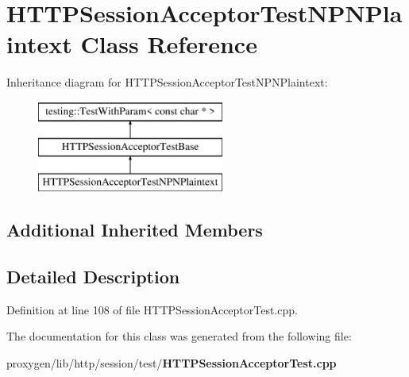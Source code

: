 \section{H\+T\+T\+P\+Session\+Acceptor\+Test\+N\+P\+N\+Plaintext Class Reference}
\label{classHTTPSessionAcceptorTestNPNPlaintext}
Inheritance diagram for H\+T\+T\+P\+Session\+Acceptor\+Test\+N\+P\+N\+Plaintext\+:\begin{figure}[H]
\begin{center}
\leavevmode
\includegraphics[height=3.000000cm]{classHTTPSessionAcceptorTestNPNPlaintext}
\end{center}
\end{figure}
\subsection*{Additional Inherited Members}


\subsection{Detailed Description}


Definition at line 108 of file H\+T\+T\+P\+Session\+Acceptor\+Test.\+cpp.



The documentation for this class was generated from the following file\+:\begin{DoxyCompactItemize}
\item 
proxygen/lib/http/session/test/{\bf H\+T\+T\+P\+Session\+Acceptor\+Test.\+cpp}\end{DoxyCompactItemize}
